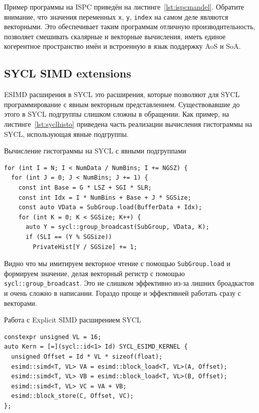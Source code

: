 Пример программы на ISPC приведён на листинге~\cref{lst:ispcmandel}. Обратите внимание, что значения переменных \lstinline!x!, \lstinline!y!, \lstinline!index! на самом деле являются векторными. Это обеспечивает таким программам отличную производительность, позволяет смешивать скалярные и векторные вычисления, иметь единое когерентное пространство имён и встроенную в язык поддержку AoS и SoA.

\subsection{SYCL SIMD extensions}\label{subsec:overview/vectorapi/dpcppesimd}

ESIMD расширения в SYCL это расширения, которые позволяют для SYCL программирование с явным векторным представлением. Существовавшие до этого в SYCL подгруппы слишком сложны в обращении. Как пример, на листинге~\cref{lst:syclhisto} приведена часть реализации вычисления гистограммы на SYCL, использующая явные подгруппы.

\begin{ListingEnv}[!h]
    \captiondelim{ } 
    \caption{Вычисление гистограммы на SYCL с явными подгруппами}\label{lst:syclhisto}
    \begin{lstlisting}[language={[ISO]C++}]
for (int I = N; I < NumData / NumBins; I += NGSZ) {
  for (int J = 0; J < NumBins; J += 1) {
    const int Base = G * LSZ + SGI * SLR;
    const int Idx = I * NumBins + Base + J * SGSize;
    const auto VData = SubGroup.load(BufferData + Idx);
    for (int K = 0; K < SGSize; K++) {
      auto Y = sycl::group_broadcast(SubGroup, VData, K);
      if (SLI == (Y % SGSize))
        PrivateHist[Y / SGSize] += 1;
    \end{lstlisting}
\end{ListingEnv}

Видно что мы имитируем векторное чтение с помощью \lstinline!SubGroup.load! и формируем значение, делая векторный регистр с помощью \lstinline!sycl::group_broadcast!. Это не слишком эффективно из-за лишних броадкастов и очень сложно в написании. Гораздо проще и эффективней работать сразу с векторами.

\begin{ListingEnv}[!h]
    \captiondelim{ } 
    \caption{Работа с Explicit SIMD расширением SYCL}\label{lst:syclesimd}
    \begin{lstlisting}[language={[ISO]C++}]
constexpr unsigned VL = 16;
auto Kern = [=](sycl::id<1> Id) SYCL_ESIMD_KERNEL {
  unsigned Offset = Id * VL * sizeof(float);
  esimd::simd<T, VL> VA = esimd::block_load<T, VL>(A, Offset);
  esimd::simd<T, VL> VB = esimd::block_load<T, VL>(B, Offset);
  esimd::simd<T, VL> VC = VA + VB;
  esimd::block_store(C, Offset, VC);
};
    \end{lstlisting}
\end{ListingEnv}

